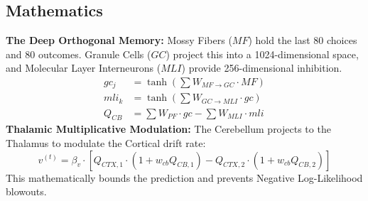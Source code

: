 \documentclass[11pt,a4paper]{article}
\begin{document}
\subsection{Mathematics}
\textbf{The Deep Orthogonal Memory:} Mossy Fibers ($MF$) hold the last 80 choices and 80 outcomes. Granule Cells ($GC$) project this into a 1024-dimensional space, and Molecular Layer Interneurons ($MLI$) provide 256-dimensional inhibition.
\begin{align}
    gc_j &= \tanh\left( \sum W_{MF \to GC} \cdot MF \right) \\
    mli_k &= \tanh\left( \sum W_{GC \to MLI} \cdot gc \right) \\
    Q_{CB} &= \sum W_{PF} \cdot gc - \sum W_{MLI} \cdot mli
\end{align}
\textbf{Thalamic Multiplicative Modulation:} The Cerebellum projects to the Thalamus to modulate the Cortical drift rate:
\begin{equation}
    v^{(t)} = \beta_v \cdot \left[ Q_{CTX, 1} \cdot (1 + w_{cb} Q_{CB, 1}) - Q_{CTX, 2} \cdot (1 + w_{cb} Q_{CB, 2}) \right]
\end{equation}
This mathematically bounds the prediction and prevents Negative Log-Likelihood blowouts.
\end{document}
